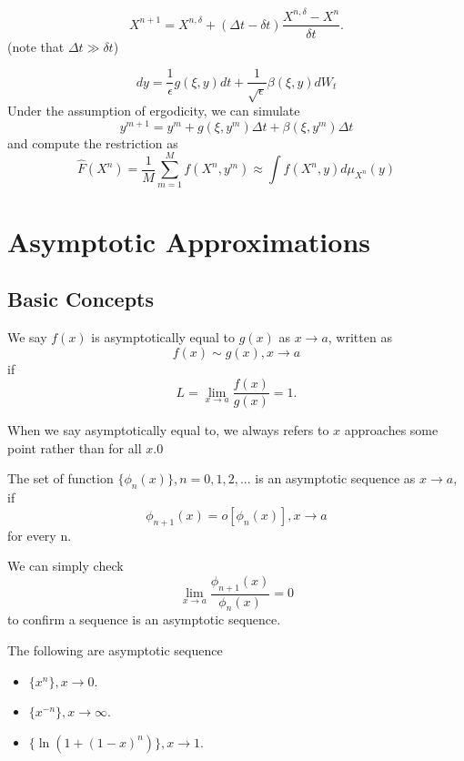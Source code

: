 \begin{refsection}
$$X^{n+1} = X^{n,\delta} + (\Delta t - \delta t) \frac{X^{n,\delta} - X^n}{\delta t}.$$
(note that $\Delta t \gg \delta t$)


\begin{remark}
	$$dy = \frac{1}{\epsilon} g(\xi,y) dt + \frac{1}{\sqrt{\epsilon}} \beta(\xi,y)dW_t$$
Under the assumption of ergodicity, we can simulate
$$y^{m+1} = y^m + g(\xi,y^m) \Delta t + \beta(\xi,y^m) \Delta t$$
and compute the restriction as
$$\hat{F}(X^n) = \frac{1}{M} \sum_{m=1}^M f(X^n,y^m) \approx \int f(X^n,y) d\mu_{X^n}(y)$$
\end{remark}

\fi

\section{Asymptotic Approximations}
\subsection{Basic Concepts}
\begin{definition}\cite[8]{holmes2012introduction}
	We say $f(x)$ is asymptotically equal to $g(x)$ as $x\to a$, written as
	$$f(x)\sim g(x), x\to a$$
	if
	$$L = \lim_{x\to a} \frac{f(x)}{g(x)} = 1.$$
\end{definition}

\begin{remark}
When we say asymptotically equal to, we always refers to $x$ approaches some point rather than for all $x$.0
\end{remark}


\begin{definition}\cite[13]{johnson2006singular}\cite[10]{holmes2012introduction}
	The set of function $\{\phi_n(x)\}, n=0,1,2,...$ is an asymptotic sequence as $x\to a$, if
	$$\phi_{n+1}(x) = o[\phi_n(x)], x\to a$$
	for every n.
\end{definition}

\begin{remark}
	We can simply check
	$$\lim_{x\to a} \frac{\phi_{n+1}(x)}{\phi_n(x)} = 0$$
	to confirm a sequence is an asymptotic sequence.
\end{remark}

\begin{example}The following are asymptotic sequence
	\begin{itemize}
		\item $\{x^n\},x\to 0$.
		\item $\{x^{-n}\},x\to \infty$.
		\item $\{\ln(1 + (1-x)^n)\}, x\to 1$.
	\end{itemize}
\end{example}





\end{refsection}
